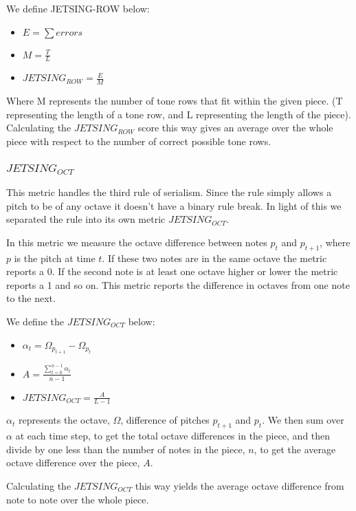 \documentclass[11pt]{article}
\begin{document}
We define JETSING-ROW below:
\begin{itemize}
    \item $E = \sum errors $
    \item $M = \frac{T}{L}$
    \item $JETSING_{ROW} = \frac{E}{M}$
\end{itemize}

Where M represents the number of tone rows that fit within the given piece.
(T representing the length of a tone row, and L representing the length of the piece).
Calculating the $JETSING_{ROW}$ score this way gives an average over the whole piece with respect to the number of correct possible tone rows.

\subsubsection{$JETSING_{OCT}$}
This metric handles the third rule of serialism.
Since the rule simply allows a pitch to be of any octave it doesn't have a binary rule break.
In light of this we separated the rule into its own metric $JETSING_{OCT}$.

In this metric we measure the octave difference between notes $p_t$ and $p_{t+1}$, where $p$ is the pitch at time $t$.
If these two notes are in the same octave the metric reports a 0.
If the second note is at least one octave higher or lower the metric reports a 1 and so on.
This metric reports the difference in octaves from one note to the next.

We define the $JETSING_{OCT}$ below:

\begin{itemize}
    \item $\alpha_t = \Omega_{p_{t+1}} - \Omega_{p_t}$
    \item $A = \frac{\sum_{t=0}^{n-1} \alpha_t}{n-1}$
    \item $JETSING_{OCT} = \frac{A}{L-1} $
\end{itemize}

$\alpha_t$ represents the octave, $\Omega$, difference of pitches $p_{t+1}$ and $p_t$.
We then sum over $\alpha$ at each time step, to get the total octave differences in the piece,
and then divide by one less than the number of notes in the piece, $n$, to get the average octave difference over the piece, $A$.

Calculating the $JETSING_{OCT}$ this way yields the average octave difference from note to note over the whole piece.
\end{document}
